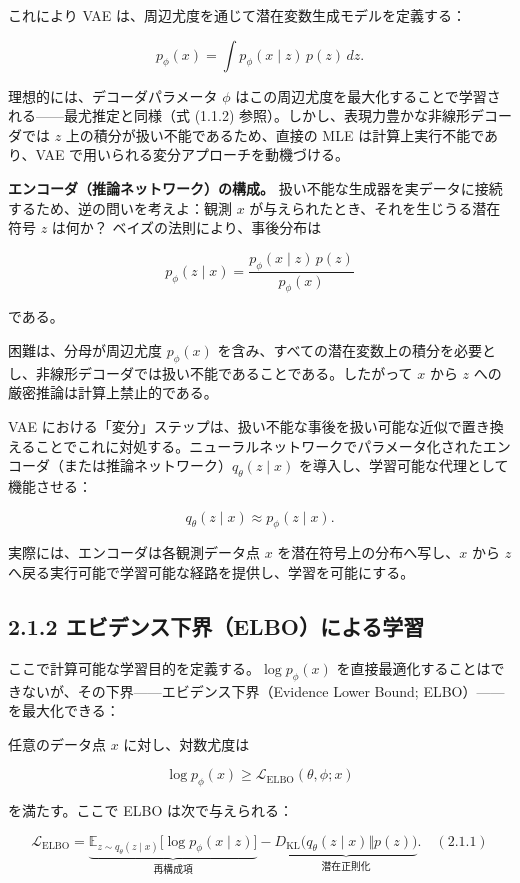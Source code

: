 これにより VAE は、周辺尤度を通じて潜在変数生成モデルを定義する：

\[
p_\phi(x) = \int p_\phi(x\mid z)\, p(z)\, dz.
\]


理想的には、デコーダパラメータ $\phi$ はこの周辺尤度を最大化することで学習される——最尤推定と同様（式 (1.1.2) 参照）。しかし、表現力豊かな非線形デコーダでは $z$ 上の積分が扱い不能であるため、直接の MLE は計算上実行不能であり、VAE で用いられる変分アプローチを動機づける。

\textbf{エンコーダ（推論ネットワーク）の構成。} 扱い不能な生成器を実データに接続するため、逆の問いを考えよ：観測 $x$ が与えられたとき、それを生じうる潜在符号 $z$ は何か？ ベイズの法則により、事後分布は

\[
p_\phi(z\mid x) = \frac{p_\phi(x\mid z)\, p(z)}{p_\phi(x)}
\]


である。

困難は、分母が周辺尤度 $p_\phi(x)$ を含み、すべての潜在変数上の積分を必要とし、非線形デコーダでは扱い不能であることである。したがって $x$ から $z$ への厳密推論は計算上禁止的である。

VAE における「変分」ステップは、扱い不能な事後を扱い可能な近似で置き換えることでこれに対処する。ニューラルネットワークでパラメータ化されたエンコーダ（または推論ネットワーク）$q_\theta(z\mid x)$ を導入し、学習可能な代理として機能させる：

\[
q_\theta(z\mid x) \approx p_\phi(z\mid x).
\]


実際には、エンコーダは各観測データ点 $x$ を潜在符号上の分布へ写し、$x$ から $z$ へ戻る実行可能で学習可能な経路を提供し、学習を可能にする。

\subsection*{2.1.2 エビデンス下界（ELBO）による学習}


ここで計算可能な学習目的を定義する。$\log p_\phi(x)$ を直接最適化することはできないが、その下界——エビデンス下界（Evidence Lower Bound; ELBO）——を最大化できる：

\begin{propositionbox}
任意のデータ点 $x$ に対し、対数尤度は

\[
\log p_\phi(x) \ge \mathcal{L}_{\mathrm{ELBO}}(\theta,\phi; x)
\]

を満たす。ここで ELBO は次で与えられる：

\[
\mathcal{L}_{\mathrm{ELBO}}
= \underbrace{\mathbb{E}_{z\sim q_\theta(z\mid x)}\bigl[\log p_\phi(x\mid z)\bigr]}_{\text{再構成項}}
- \underbrace{D_{\mathrm{KL}}\bigl(q_\theta(z\mid x)\Vert p(z)\bigr)}_{\text{潜在正則化}}. \quad (2.1.1)
\]
\end{propositionbox}


